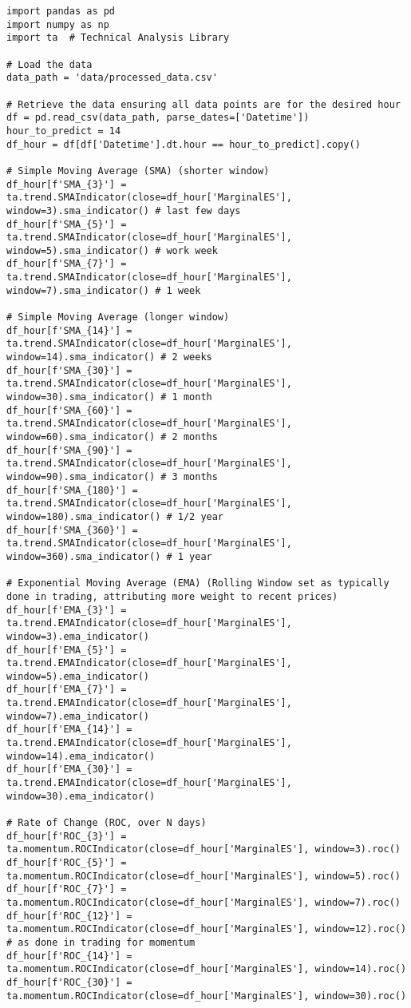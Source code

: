 \documentclass[12pt]{report} %
\begin{document}
\begin{lstlisting}
import pandas as pd
import numpy as np
import ta  # Technical Analysis Library

# Load the data
data_path = 'data/processed_data.csv'

# Retrieve the data ensuring all data points are for the desired hour
df = pd.read_csv(data_path, parse_dates=['Datetime'])
hour_to_predict = 14
df_hour = df[df['Datetime'].dt.hour == hour_to_predict].copy()

# Simple Moving Average (SMA) (shorter window)
df_hour[f'SMA_{3}'] = ta.trend.SMAIndicator(close=df_hour['MarginalES'], window=3).sma_indicator() # last few days
df_hour[f'SMA_{5}'] = ta.trend.SMAIndicator(close=df_hour['MarginalES'], window=5).sma_indicator() # work week
df_hour[f'SMA_{7}'] = ta.trend.SMAIndicator(close=df_hour['MarginalES'], window=7).sma_indicator() # 1 week

# Simple Moving Average (longer window)
df_hour[f'SMA_{14}'] = ta.trend.SMAIndicator(close=df_hour['MarginalES'], window=14).sma_indicator() # 2 weeks
df_hour[f'SMA_{30}'] = ta.trend.SMAIndicator(close=df_hour['MarginalES'], window=30).sma_indicator() # 1 month
df_hour[f'SMA_{60}'] = ta.trend.SMAIndicator(close=df_hour['MarginalES'], window=60).sma_indicator() # 2 months
df_hour[f'SMA_{90}'] = ta.trend.SMAIndicator(close=df_hour['MarginalES'], window=90).sma_indicator() # 3 months
df_hour[f'SMA_{180}'] = ta.trend.SMAIndicator(close=df_hour['MarginalES'], window=180).sma_indicator() # 1/2 year
df_hour[f'SMA_{360}'] = ta.trend.SMAIndicator(close=df_hour['MarginalES'], window=360).sma_indicator() # 1 year

# Exponential Moving Average (EMA) (Rolling Window set as typically done in trading, attributing more weight to recent prices)
df_hour[f'EMA_{3}'] = ta.trend.EMAIndicator(close=df_hour['MarginalES'], window=3).ema_indicator()
df_hour[f'EMA_{5}'] = ta.trend.EMAIndicator(close=df_hour['MarginalES'], window=5).ema_indicator()
df_hour[f'EMA_{7}'] = ta.trend.EMAIndicator(close=df_hour['MarginalES'], window=7).ema_indicator()
df_hour[f'EMA_{14}'] = ta.trend.EMAIndicator(close=df_hour['MarginalES'], window=14).ema_indicator()
df_hour[f'EMA_{30}'] = ta.trend.EMAIndicator(close=df_hour['MarginalES'], window=30).ema_indicator()

# Rate of Change (ROC, over N days)
df_hour[f'ROC_{3}'] = ta.momentum.ROCIndicator(close=df_hour['MarginalES'], window=3).roc()
df_hour[f'ROC_{5}'] = ta.momentum.ROCIndicator(close=df_hour['MarginalES'], window=5).roc()
df_hour[f'ROC_{7}'] = ta.momentum.ROCIndicator(close=df_hour['MarginalES'], window=7).roc()
df_hour[f'ROC_{12}'] = ta.momentum.ROCIndicator(close=df_hour['MarginalES'], window=12).roc() # as done in trading for momentum
df_hour[f'ROC_{14}'] = ta.momentum.ROCIndicator(close=df_hour['MarginalES'], window=14).roc()
df_hour[f'ROC_{30}'] = ta.momentum.ROCIndicator(close=df_hour['MarginalES'], window=30).roc()


\end{lstlisting}
\end{document}
